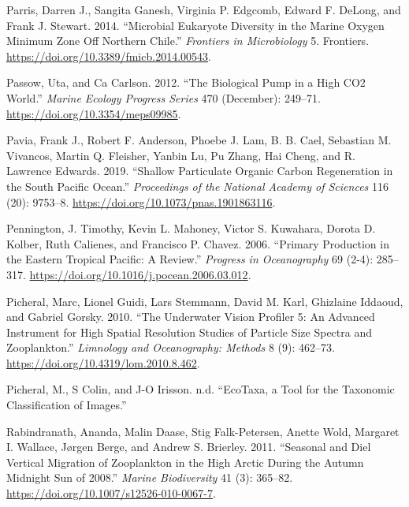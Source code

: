 \documentclass[]{article}
\begin{document}
\leavevmode\hypertarget{ref-parrisMicrobialEukaryoteDiversity2014}{}%
Parris, Darren J., Sangita Ganesh, Virginia P. Edgcomb, Edward F.
DeLong, and Frank J. Stewart. 2014. ``Microbial Eukaryote Diversity in
the Marine Oxygen Minimum Zone Off Northern Chile.'' \emph{Frontiers in
Microbiology} 5. Frontiers.
\url{https://doi.org/10.3389/fmicb.2014.00543}.

\leavevmode\hypertarget{ref-passowBiologicalPumpHigh2012}{}%
Passow, Uta, and Ca Carlson. 2012. ``The Biological Pump in a High CO2
World.'' \emph{Marine Ecology Progress Series} 470 (December): 249--71.
\url{https://doi.org/10.3354/meps09985}.

\leavevmode\hypertarget{ref-paviaShallowParticulateOrganic2019}{}%
Pavia, Frank J., Robert F. Anderson, Phoebe J. Lam, B. B. Cael,
Sebastian M. Vivancos, Martin Q. Fleisher, Yanbin Lu, Pu Zhang, Hai
Cheng, and R. Lawrence Edwards. 2019. ``Shallow Particulate Organic
Carbon Regeneration in the South Pacific Ocean.'' \emph{Proceedings of
the National Academy of Sciences} 116 (20): 9753--8.
\url{https://doi.org/10.1073/pnas.1901863116}.

\leavevmode\hypertarget{ref-penningtonPrimaryProductionEastern2006}{}%
Pennington, J. Timothy, Kevin L. Mahoney, Victor S. Kuwahara, Dorota D.
Kolber, Ruth Calienes, and Francisco P. Chavez. 2006. ``Primary
Production in the Eastern Tropical Pacific: A Review.'' \emph{Progress
in Oceanography} 69 (2-4): 285--317.
\url{https://doi.org/10.1016/j.pocean.2006.03.012}.

\leavevmode\hypertarget{ref-picheralUnderwaterVisionProfiler2010}{}%
Picheral, Marc, Lionel Guidi, Lars Stemmann, David M. Karl, Ghizlaine
Iddaoud, and Gabriel Gorsky. 2010. ``The Underwater Vision Profiler 5:
An Advanced Instrument for High Spatial Resolution Studies of Particle
Size Spectra and Zooplankton.'' \emph{Limnology and Oceanography:
Methods} 8 (9): 462--73. \url{https://doi.org/10.4319/lom.2010.8.462}.

\leavevmode\hypertarget{ref-picheralEcoTaxaToolTaxonomic}{}%
Picheral, M., S Colin, and J-O Irisson. n.d. ``EcoTaxa, a Tool for the
Taxonomic Classification of Images.''

\leavevmode\hypertarget{ref-rabindranathSeasonalDielVertical2011}{}%
Rabindranath, Ananda, Malin Daase, Stig Falk-Petersen, Anette Wold,
Margaret I. Wallace, Jørgen Berge, and Andrew S. Brierley. 2011.
``Seasonal and Diel Vertical Migration of Zooplankton in the High Arctic
During the Autumn Midnight Sun of 2008.'' \emph{Marine Biodiversity} 41
(3): 365--82. \url{https://doi.org/10.1007/s12526-010-0067-7}.
\end{document}
